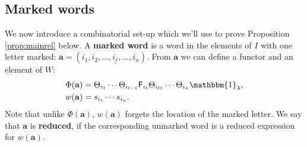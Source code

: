 \documentclass[11pt,reqno]{amsart}
\numberwithin{equation}{section}
\theoremstyle{definition}
\theoremstyle{named}
\newcommand{\sF}{\mathsf{F}}
\newcommand{\ba}{\mathbf{a}}
\newcommand{\ul}[1]{\underline{#1}}
\newcommand{\bone}{\mathbbm{1}}
\begin{document}
\subsection{Marked words}
We now introduce a combinatorial set-up which we'll use to prove  Proposition \ref{prop:mainrel} below.  A \textbf{marked word} is a word in the elements of $I$ with one letter marked: $\ba=(i_1,i_2,...,\ul{i_\ell},...,i_n)$.  From $\ba$ we can define a functor and an element of $W$: 
\begin{align*}
\Phi(\ba)&=\Theta_{i_1}\cdots\Theta_{i_{\ell-1}}\sF_{i_\ell}\Theta_{i_{\ell1}}\cdots \Theta_{i_n}\bone_\lambda, \\
w(\ba)&=s_{i_1}\cdots s_{i_n}.
\end{align*}
Note that unlike $\Phi(\ba)$, $w(\ba)$ forgets the location of the marked letter.  We say that $\ba$ is \textbf{reduced}, if the corresponding unmarked word is a reduced expression for $w(\ba)$. 
\end{document}
